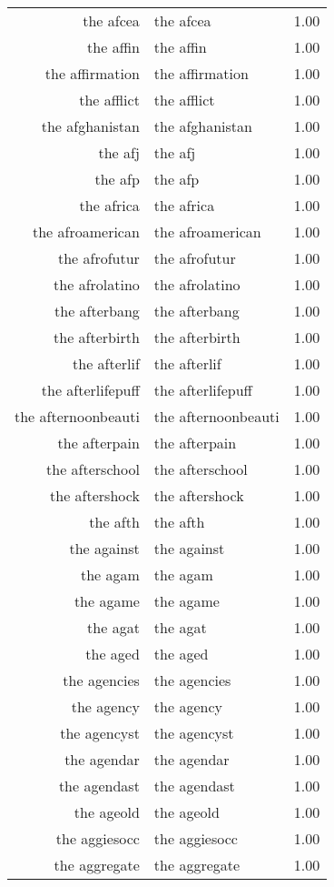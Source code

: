 \begin{table}[ht]
\begin{tabular}{rlr}
  the afcea & the afcea & 1.00 \\ 
  the affin & the affin & 1.00 \\ 
  the affirmation & the affirmation & 1.00 \\ 
  the afflict & the afflict & 1.00 \\ 
  the afghanistan & the afghanistan & 1.00 \\ 
  the afj & the afj & 1.00 \\ 
  the afp & the afp & 1.00 \\ 
  the africa & the africa & 1.00 \\ 
  the afroamerican & the afroamerican & 1.00 \\ 
  the afrofutur & the afrofutur & 1.00 \\ 
  the afrolatino & the afrolatino & 1.00 \\ 
  the afterbang & the afterbang & 1.00 \\ 
  the afterbirth & the afterbirth & 1.00 \\ 
  the afterlif & the afterlif & 1.00 \\ 
  the afterlifepuff & the afterlifepuff & 1.00 \\ 
  the afternoonbeauti & the afternoonbeauti & 1.00 \\ 
  the afterpain & the afterpain & 1.00 \\ 
  the afterschool & the afterschool & 1.00 \\ 
  the aftershock & the aftershock & 1.00 \\ 
  the afth & the afth & 1.00 \\ 
  the against & the against & 1.00 \\ 
  the agam & the agam & 1.00 \\ 
  the agame & the agame & 1.00 \\ 
  the agat & the agat & 1.00 \\ 
  the aged & the aged & 1.00 \\ 
  the agencies & the agencies & 1.00 \\ 
  the agency & the agency & 1.00 \\ 
  the agencyst & the agencyst & 1.00 \\ 
  the agendar & the agendar & 1.00 \\ 
  the agendast & the agendast & 1.00 \\ 
  the ageold & the ageold & 1.00 \\ 
  the aggiesocc & the aggiesocc & 1.00 \\ 
  the aggregate & the aggregate & 1.00 \\ 

\end{tabular}
\end{table}
